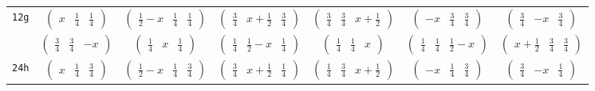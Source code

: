 \documentclass[fleqn,9pt,landscape]{jsarticle}
\begin{document}
\begin{center}
\begin{longtable}{ccccccc}
{\tt 12g} & $ \begin{pmatrix} x & \frac{1}{4} & \frac{1}{4} \end{pmatrix} $ & $ \begin{pmatrix} \frac{1}{2} - x & \frac{1}{4} & \frac{1}{4} \end{pmatrix} $ & $ \begin{pmatrix} \frac{3}{4} & x + \frac{1}{2} & \frac{3}{4} \end{pmatrix} $ & $ \begin{pmatrix} \frac{3}{4} & \frac{3}{4} & x + \frac{1}{2} \end{pmatrix} $ & $ \begin{pmatrix} - x & \frac{3}{4} & \frac{3}{4} \end{pmatrix} $ & $ \begin{pmatrix} \frac{3}{4} & - x & \frac{3}{4} \end{pmatrix} $ \\
& $ \begin{pmatrix} \frac{3}{4} & \frac{3}{4} & - x \end{pmatrix} $ & $ \begin{pmatrix} \frac{1}{4} & x & \frac{1}{4} \end{pmatrix} $ & $ \begin{pmatrix} \frac{1}{4} & \frac{1}{2} - x & \frac{1}{4} \end{pmatrix} $ & $ \begin{pmatrix} \frac{1}{4} & \frac{1}{4} & x \end{pmatrix} $ & $ \begin{pmatrix} \frac{1}{4} & \frac{1}{4} & \frac{1}{2} - x \end{pmatrix} $ & $ \begin{pmatrix} x + \frac{1}{2} & \frac{3}{4} & \frac{3}{4} \end{pmatrix} $ \\ \hline
{\tt 24h} & $ \begin{pmatrix} x & \frac{1}{4} & \frac{3}{4} \end{pmatrix} $ & $ \begin{pmatrix} \frac{1}{2} - x & \frac{1}{4} & \frac{3}{4} \end{pmatrix} $ & $ \begin{pmatrix} \frac{3}{4} & x + \frac{1}{2} & \frac{1}{4} \end{pmatrix} $ & $ \begin{pmatrix} \frac{1}{4} & \frac{3}{4} & x + \frac{1}{2} \end{pmatrix} $ & $ \begin{pmatrix} - x & \frac{1}{4} & \frac{3}{4} \end{pmatrix} $ & $ \begin{pmatrix} \frac{3}{4} & - x & \frac{1}{4} \end{pmatrix} $ \\

\end{longtable}
\end{center}
\end{document}

